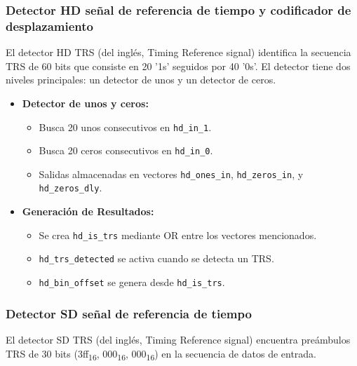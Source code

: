 \subsubsection{Detector HD señal de referencia de tiempo y codificador de desplazamiento}

El detector HD TRS (del inglés, Timing Reference signal) identifica la secuencia TRS de 60 bits que consiste en 20
'1s' seguidos por 40 '0s'. El detector tiene dos niveles principales: un
detector de unos y un detector de ceros.

\begin{itemize}
    \item \textbf{Detector de unos y ceros:}
    \begin{itemize}
        \item Busca 20 unos consecutivos en \texttt{hd\_in\_1}.
        \item Busca 20 ceros consecutivos en \texttt{hd\_in\_0}.
        \item Salidas almacenadas en vectores \texttt{hd\_ones\_in}, \texttt{hd\_zeros\_in}, y \texttt{hd\_zeros\_dly}.
    \end{itemize}
    
    \item \textbf{Generación de Resultados:}
    \begin{itemize}
        \item Se crea \texttt{hd\_is\_trs} mediante OR entre los vectores mencionados.
        \item \texttt{hd\_trs\_detected} se activa cuando se detecta un TRS.
        \item \texttt{hd\_bin\_offset} se genera desde \texttt{hd\_is\_trs}.
    \end{itemize}
\end{itemize}

\subsubsection{Detector SD señal de referencia de tiempo}

El detector SD TRS (del inglés, Timing Reference signal) encuentra preámbulos TRS de 30 bits (3ff\textsubscript{16},
000\textsubscript{16}, 000\textsubscript{16}) en
la secuencia de datos de entrada.

